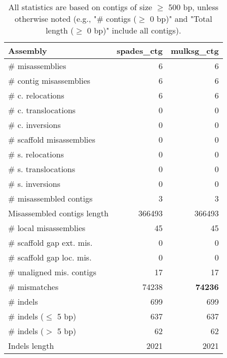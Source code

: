 \documentclass[12pt,a4paper]{article}
\begin{document}
\begin{table}[ht]
\begin{center}
\caption{All statistics are based on contigs of size $\geq$ 500 bp, unless otherwise noted (e.g., "\# contigs ($\geq$ 0 bp)" and "Total length ($\geq$ 0 bp)" include all contigs).}
\begin{tabular}{|l*{2}{|r}|}
\hline
Assembly & spades\_ctg & mulksg\_ctg \\ \hline
\# misassemblies & 6 & 6 \\ \hline
\hspace{2mm}\# contig misassemblies & 6 & 6 \\ \hline
\hspace{5mm}\# c. relocations & 6 & 6 \\ \hline
\hspace{5mm}\# c. translocations & 0 & 0 \\ \hline
\hspace{5mm}\# c. inversions & 0 & 0 \\ \hline
\hspace{2mm}\# scaffold misassemblies & 0 & 0 \\ \hline
\hspace{5mm}\# s. relocations & 0 & 0 \\ \hline
\hspace{5mm}\# s. translocations & 0 & 0 \\ \hline
\hspace{5mm}\# s. inversions & 0 & 0 \\ \hline
\# misassembled contigs & 3 & 3 \\ \hline
Misassembled contigs length & 366493 & 366493 \\ \hline
\# local misassemblies & 45 & 45 \\ \hline
\# scaffold gap ext. mis. & 0 & 0 \\ \hline
\# scaffold gap loc. mis. & 0 & 0 \\ \hline
\# unaligned mis. contigs & 17 & 17 \\ \hline
\# mismatches & 74238 & {\bf 74236} \\ \hline
\# indels & 699 & 699 \\ \hline
\hspace{5mm}\# indels ($\leq$ 5 bp) & 637 & 637 \\ \hline
\hspace{5mm}\# indels ($>$ 5 bp) & 62 & 62 \\ \hline
Indels length & 2021 & 2021 \\ \hline
\end{tabular}
\end{center}
\end{table}
\end{document}
